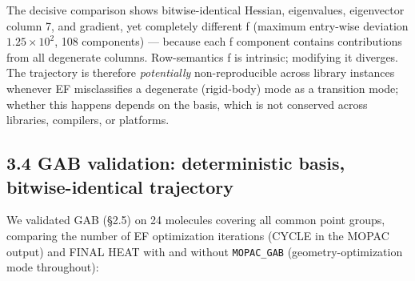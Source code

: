 \documentclass[preprint,12pt]{elsarticle}
\begin{document}
The decisive comparison shows bitwise-identical Hessian, eigenvalues, eigenvector column 7, and gradient, yet completely different f (maximum entry-wise deviation $1.25\times 10^{2}$, 108 components) --- because each f component contains contributions from all degenerate columns. Row-semantics f is intrinsic; modifying it diverges. The trajectory is therefore \textit{potentially} non-reproducible across library instances whenever EF misclassifies a degenerate (rigid-body) mode as a transition mode; whether this happens depends on the basis, which is not conserved across libraries, compilers, or platforms.


\subsection{3.4 GAB validation: deterministic basis, bitwise-identical trajectory}
We validated GAB (\S{}2.5) on 24 molecules covering all common point groups, comparing the number of EF optimization iterations (CYCLE in the MOPAC output) and FINAL HEAT with and without \texttt{MOPAC\_GAB} (geometry-optimization mode throughout):
\end{document}
